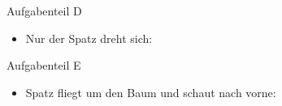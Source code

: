 \documentclass{beamer}
\begin{document}
\begin{frame}{Aufgabenteil D}
\begin{itemize}
\item Nur der Spatz dreht sich:
\end{itemize}
\begin{figure}
    \centering
\end{figure}
\end{frame}

\begin{frame}{Aufgabenteil E}
\begin{itemize}
\item Spatz fliegt um den Baum und schaut nach vorne:
\end{itemize}
\begin{figure}
    \centering
\end{figure}
\end{frame}
\end{document}
